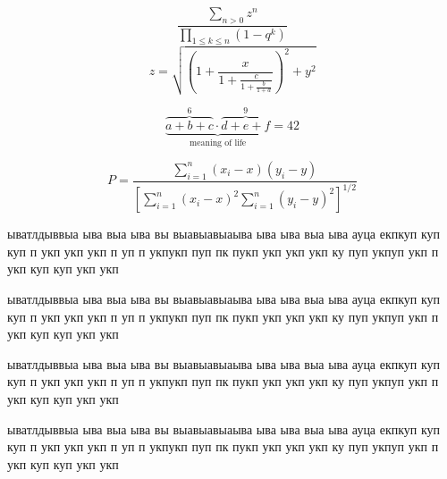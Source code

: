 \documentclass{khaireport}
\begin{document}
\begin{equation}
\frac{{\displaystyle\sum\nolimits_{n> 0} z^n}}
{{\displaystyle\prod\nolimits_{1\leq k\leq n} (1-q^k)}}
\end{equation}
\begin{equation}
z = \sqrt{(1 + \frac{x}{1 + \frac{c}{1 + \frac{b}{1+d}}})^2+y^2}
\end{equation}

\begin{equation}
\underbrace{\overbrace{a+b+c}^6
\cdot \overbrace{d+e+f}^9}
_\text{meaning of life} = 42
\end{equation}

\begin{equation}
P = \frac{\displaystyle{
\sum_{i=1}^n (x_i- x)
(y_i- y)}}
{\displaystyle{\left[
\sum_{i=1}^n(x_i-x)^2
\sum_{i=1}^n(y_i- y)^2
\right]^{1/2}}}
\end{equation}

ыватлдыввыа ыва выа ыва вы
выавыавыаыва ыва ыва выа ыва ауца екпкуп
куп куп п укп укп укп п уп п укпукп
пуп  пк пукп укп укп укп ку пуп укпуп укп
п укп куп куп укп укп

ыватлдыввыа ыва выа ыва вы
выавыавыаыва ыва ыва выа ыва ауца екпкуп
куп куп п укп укп укп п уп п укпукп
пуп  пк пукп укп укп укп ку пуп укпуп укп
п укп куп куп укп укп

ыватлдыввыа ыва выа ыва вы
выавыавыаыва ыва ыва выа ыва ауца екпкуп
куп куп п укп укп укп п уп п укпукп
пуп  пк пукп укп укп укп ку пуп укпуп укп
п укп куп куп укп укп

ыватлдыввыа ыва выа ыва вы
выавыавыаыва ыва ыва выа ыва ауца екпкуп
куп куп п укп укп укп п уп п укпукп
пуп  пк пукп укп укп укп ку пуп укпуп укп
п укп куп куп укп укп
\end{document}
